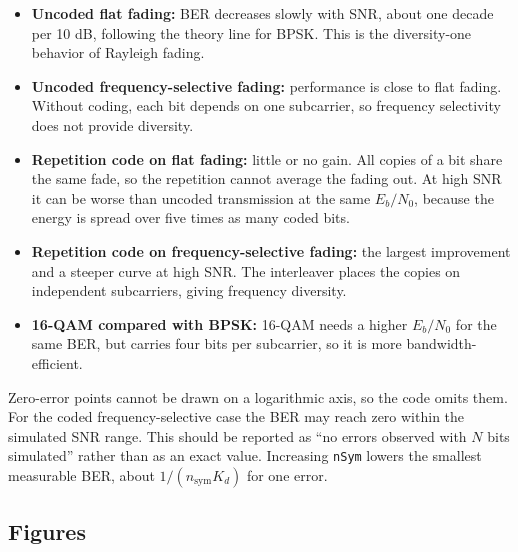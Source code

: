 \documentclass[11pt,a4paper]{article}
\begin{document}
\begin{itemize}[leftmargin=*]
  \item \textbf{Uncoded flat fading:} BER decreases slowly with SNR, about one decade per 10 dB, following the theory line for BPSK. This is the diversity-one behavior of Rayleigh fading.
  \item \textbf{Uncoded frequency-selective fading:} performance is close to flat fading. Without coding, each bit depends on one subcarrier, so frequency selectivity does not provide diversity.
  \item \textbf{Repetition code on flat fading:} little or no gain. All copies of a bit share the same fade, so the repetition cannot average the fading out. At high SNR it can be worse than uncoded transmission at the same $E_b/N_0$, because the energy is spread over five times as many coded bits.
  \item \textbf{Repetition code on frequency-selective fading:} the largest improvement and a steeper curve at high SNR. The interleaver places the copies on independent subcarriers, giving frequency diversity.
  \item \textbf{16-QAM compared with BPSK:} 16-QAM needs a higher $E_b/N_0$ for the same BER, but carries four bits per subcarrier, so it is more bandwidth-efficient.
\end{itemize}

Zero-error points cannot be drawn on a logarithmic axis, so the code omits them. For the coded frequency-selective case the BER may reach zero within the simulated SNR range. This should be reported as ``no errors observed with $N$ bits simulated'' rather than as an exact value. Increasing \texttt{nSym} lowers the smallest measurable BER, about $1/(n_{\mathrm{sym}} K_d)$ for one error.

\subsection*{Figures}
\end{document}

